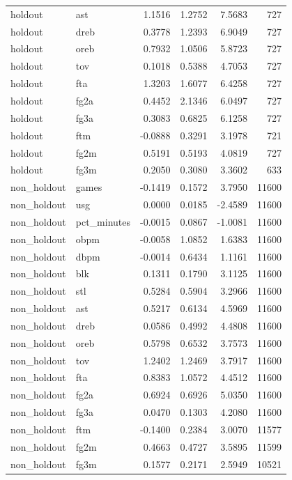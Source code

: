 \begin{table}
\begin{tabular}{llrrrr}
holdout & ast & 1.1516 & 1.2752 & 7.5683 & 727 \\
holdout & dreb & 0.3778 & 1.2393 & 6.9049 & 727 \\
holdout & oreb & 0.7932 & 1.0506 & 5.8723 & 727 \\
holdout & tov & 0.1018 & 0.5388 & 4.7053 & 727 \\
holdout & fta & 1.3203 & 1.6077 & 6.4258 & 727 \\
holdout & fg2a & 0.4452 & 2.1346 & 6.0497 & 727 \\
holdout & fg3a & 0.3083 & 0.6825 & 6.1258 & 727 \\
holdout & ftm & -0.0888 & 0.3291 & 3.1978 & 721 \\
holdout & fg2m & 0.5191 & 0.5193 & 4.0819 & 727 \\
holdout & fg3m & 0.2050 & 0.3080 & 3.3602 & 633 \\
non\_holdout & games & -0.1419 & 0.1572 & 3.7950 & 11600 \\
non\_holdout & usg & 0.0000 & 0.0185 & -2.4589 & 11600 \\
non\_holdout & pct\_minutes & -0.0015 & 0.0867 & -1.0081 & 11600 \\
non\_holdout & obpm & -0.0058 & 1.0852 & 1.6383 & 11600 \\
non\_holdout & dbpm & -0.0014 & 0.6434 & 1.1161 & 11600 \\
non\_holdout & blk & 0.1311 & 0.1790 & 3.1125 & 11600 \\
non\_holdout & stl & 0.5284 & 0.5904 & 3.2966 & 11600 \\
non\_holdout & ast & 0.5217 & 0.6134 & 4.5969 & 11600 \\
non\_holdout & dreb & 0.0586 & 0.4992 & 4.4808 & 11600 \\
non\_holdout & oreb & 0.5798 & 0.6532 & 3.7573 & 11600 \\
non\_holdout & tov & 1.2402 & 1.2469 & 3.7917 & 11600 \\
non\_holdout & fta & 0.8383 & 1.0572 & 4.4512 & 11600 \\
non\_holdout & fg2a & 0.6924 & 0.6926 & 5.0350 & 11600 \\
non\_holdout & fg3a & 0.0470 & 0.1303 & 4.2080 & 11600 \\
non\_holdout & ftm & -0.1400 & 0.2384 & 3.0070 & 11577 \\
non\_holdout & fg2m & 0.4663 & 0.4727 & 3.5895 & 11599 \\
non\_holdout & fg3m & 0.1577 & 0.2171 & 2.5949 & 10521 \\
\bottomrule
\end{tabular}
\end{table}
